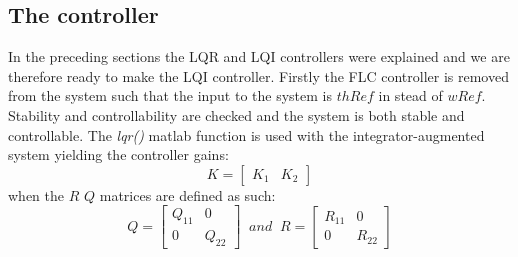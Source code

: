 \subsection{The controller} \label{sec:ctrl_thecontroller}
In the preceding sections the LQR and LQI controllers were explained and we are therefore ready to make the LQI controller. Firstly the FLC controller is removed from the system such that the input to the system is $ thRef $ in stead of $ wRef $. Stability and controllability are checked and the system is both stable and controllable. The \textit{lqr()} matlab function is used with the integrator-augmented system yielding the controller gains:
\begin{equation}\label{eq:lqi_K}
	K = \begin{bmatrix} K_1 & K_2	\end{bmatrix}
\end{equation}
when the $ R $  $ Q $ matrices are defined as such:
\begin{equation}\label{eq:lqi_Q_and_R}
	Q = \begin{bmatrix} Q_11 	& 0 \\
						0		& Q_22 \end{bmatrix} \;\; and \;\; 
	R = \begin{bmatrix} R_11 	& 0 \\
						0 		& R_22 \end{bmatrix}
\end{equation}